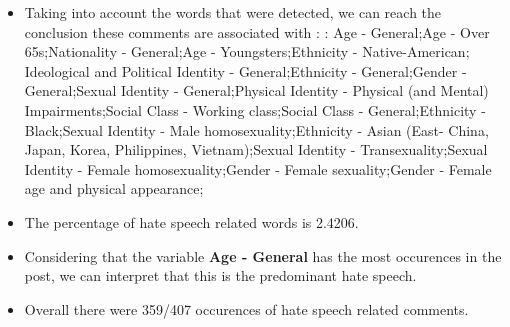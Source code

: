 \documentclass[11pt]{article}
\begin{document}
\begin{itemize}\item Taking into account the words that were detected, we can reach the conclusion these comments are associated with : : Age - General;Age - Over 65s;Nationality - General;Age - Youngsters;Ethnicity - Native-American; Ideological and Political Identity - General;Ethnicity - General;Gender - General;Sexual Identity - General;Physical Identity - Physical (and Mental) Impairments;Social Class - Working class;Social Class - General;Ethnicity - Black;Sexual Identity - Male homosexuality;Ethnicity - Asian (East- China, Japan, Korea, Philippines, Vietnam);Sexual Identity - Transexuality;Sexual Identity - Female homosexuality;Gender - Female sexuality;Gender - Female age and physical appearance;%

\item The percentage of hate speech related words is 2.4206.

\item Considering that the variable \textbf{Age - General} has the most occurences in the post, we can interpret that this is the predominant hate speech.

\item Overall there were 359/407 occurences of hate speech related comments.\end{itemize}
\end{document}
